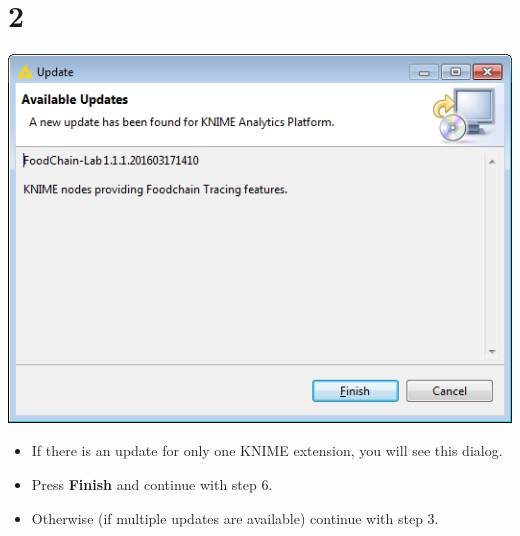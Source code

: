 \documentclass{beamer}
\begin{document}
\section{2}
\begin{frame}
	\begin{center}
  		\includegraphics[height=0.6\textheight]{2.png}
	\end{center}
	\begin{itemize}
		\item If there is an update for only one KNIME extension, you will see this dialog.
		\item Press \textbf{Finish} and continue with step 6.
		\item Otherwise (if multiple updates are available) continue with step 3.
	\end{itemize}
\end{frame}
\end{document}
